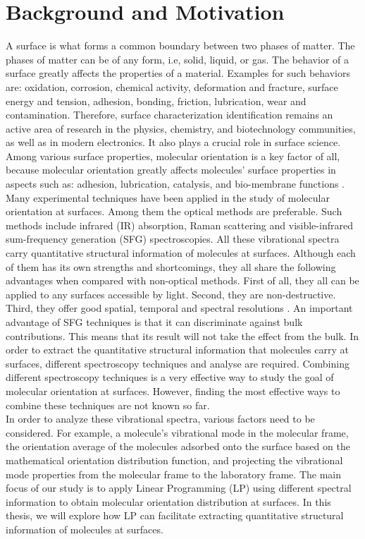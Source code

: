  \label{ch:1}
\section{Background and Motivation}
A surface is what forms a common boundary between two phases of matter. The phases of matter can be of any form, i.e, solid, liquid, or gas. The behavior of a surface greatly affects the properties of a material. Examples for such behaviors are: oxidation, corrosion, chemical activity, deformation and fracture, surface energy and tension, adhesion, bonding, friction, lubrication, wear and contamination. Therefore, surface characterization identification remains an active area of research in the physics, chemistry, and biotechnology communities, as well as in modern electronics. It also plays a crucial role in surface science. Among various surface properties, molecular orientation is a key factor of all, because molecular orientation greatly affects molecules' surface properties in aspects such as: adhesion, lubrication, catalysis, and bio-membrane functions \cite{PhysRevB.59.12632}.\\

Many experimental techniques have been applied in the study of molecular orientation at surfaces. Among them the optical methods are preferable. Such methods include infrared (IR) absorption, Raman scattering and visible-infrared sum-frequency generation (SFG) spectroscopies. All these vibrational spectra carry quantitative structural information of molecules at surfaces. Although each of them has its own strengths and shortcomings, they all share the following advantages when compared with non-optical methods. First of all, they all can be applied to any surfaces accessible by light. Second, they are non-destructive. Third, they offer good spatial, temporal and spectral resolutions \cite{Brasselet:11, PhysRevB.59.12632}. An important advantage of SFG techniques is that it can discriminate against bulk contributions. This means that its result will not take the effect from the bulk. In order to extract the quantitative structural information that molecules carry at surfaces, different spectroscopy techniques and analyse are required. Combining different spectroscopy techniques is a very effective way to study the goal of molecular orientation at surfaces. However, finding the most effective ways to combine these techniques are not known so far.\\

In order to analyze these vibrational spectra, various factors need to be considered. For example, a molecule's vibrational mode in the molecular frame, the orientation average of the molecules adsorbed onto the surface based on the mathematical orientation distribution function, and projecting the vibrational mode properties from the molecular frame to the laboratory frame. The main focus of our study is to apply Linear Programming (LP) using different spectral information to obtain molecular orientation distribution at surfaces. In this thesis, we will explore how LP can facilitate extracting quantitative structural information of molecules at surfaces.\\

